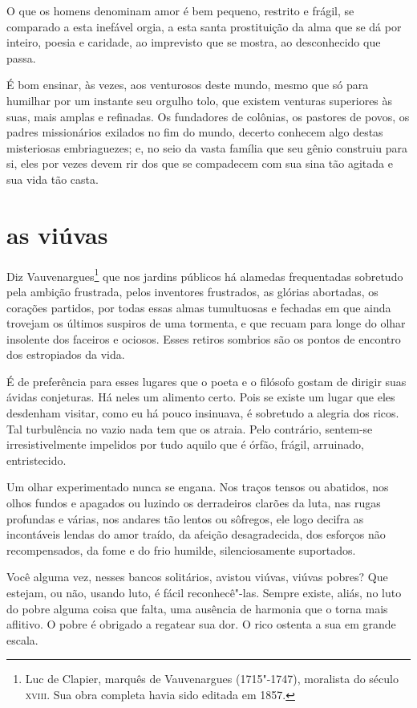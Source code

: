O que os homens denominam amor é bem pequeno, restrito e frágil, se 
comparado a esta inefável orgia, a esta santa prostituição da alma
que se dá por inteiro, poesia e caridade, ao imprevisto que se mostra, ao
desconhecido que passa.

\quebra
É bom ensinar, às vezes, aos venturosos deste mundo, mesmo que só para
humilhar por um instante seu orgulho tolo, que existem venturas
superiores às suas, mais amplas e refinadas. Os fundadores de colônias,
os pastores de povos, os padres missionários exilados no fim do mundo,
decerto conhecem algo destas misteriosas embriaguezes; e, no seio da
vasta família que seu gênio construiu para si, eles por vezes devem rir
dos que se compadecem com sua sina tão agitada e sua vida tão
casta.

\quebra\section[As viúvas]{as viúvas}

Diz Vauvenargues\protect\footnote{
 Luc de Clapier, marquês de Vauvenargues (1715"-1747), moralista do
século \textsc{xviii}. Sua obra completa havia sido editada em 1857.}
 que nos jardins públicos há
alamedas frequentadas sobretudo pela ambição frustrada, pelos
inventores frustrados, as glórias abortadas, os corações partidos,
por todas essas almas tumultuosas e fechadas em que ainda trovejam
os últimos suspiros de uma tormenta, e que recuam para longe do olhar
insolente dos faceiros e ociosos. Esses retiros sombrios são os
pontos de encontro dos estropiados da vida.

É de preferência para esses lugares que o poeta e o filósofo gostam de
dirigir suas ávidas conjeturas. Há neles um alimento certo. Pois se
existe um lugar que eles desdenham visitar, como eu há pouco insinuava,
é sobretudo a alegria dos ricos. Tal turbulência no vazio nada tem que
os atraia. Pelo contrário, sentem-se irresistivelmente impelidos
por tudo aquilo que é órfão, frágil, arruinado, entristecido.

Um olhar experimentado nunca se engana. Nos traços tensos ou
abatidos, nos olhos fundos e apagados ou luzindo os derradeiros clarões
da luta, nas rugas profundas e várias, nos andares tão
lentos ou sôfregos, ele logo decifra as incontáveis lendas do amor
traído, da afeição desagradecida, dos esforços não recompensados, da
fome e do frio humilde, silenciosamente suportados.

Você alguma vez, nesses bancos solitários, avistou viúvas, viúvas
pobres? Que estejam, ou não, usando luto, é fácil reconhecê"-las. Sempre existe, aliás, no luto do pobre alguma coisa que falta, uma ausência de
harmonia que o torna mais aflitivo. O pobre é obrigado a regatear sua dor. O
rico ostenta a sua em grande escala.

